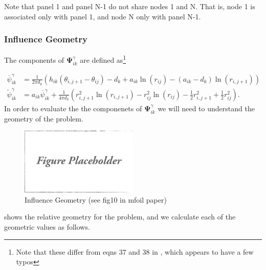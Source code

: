 \documentclass[]{article}
\begin{document}
\noindent Note that panel 1 and panel N-1 do not share nodes 1 and N. That is, node 1 is associated only with panel 1, and node N only with panel N-1. 


\subsubsection{Influence Geometry}

The components of \(\mathbf{\Psi}^\gamma_{ik}\) are defined as\footnote{Note that these differ from eqns 37 and 38 in \cite{fidkowski_coupled_2022}, which appears to have a few typos} 

\begin{align}
	\overline{\psi}^\gamma_{ik} &= \frac{1}{2\pi d_k} \left( h_{ik} (\theta_{i,j+1} - \theta_{ij}) - d_k + a_{ik} \ln(r_{ij}) - (a_{ik}-d_k)\ln(r_{i,j+1}) \right) \\
	\widetilde{\psi}^\gamma_{ik} &= a_{ik}\overline{\psi}^\gamma_{ik} + \frac{1}{4\pi d_k } \left(r^2_{i,j+1} \ln(r_{i,j+1}) - r^2_{ij} \ln(r_{ij}) - \frac{1}{2}r^2_{i,j+1} + \frac{1}{2}r^2_{ij} \right).
\end{align}
\noindent In order to evaluate the the componenets of \(\mathbf{\Psi}^\gamma_{ik}\) we will need to understand the geometry of the problem.

\begin{figure}[h]
	\centering
	\includegraphics[width=0.5\textwidth]{draft}
	\caption{Influence Geometry (see fig10 in mfoil paper)}
	\label{fig:influencegeometry}
\end{figure}

 shows the relative geometry for the problem, and we calculate each of the geometric values as follows.
\end{document}
